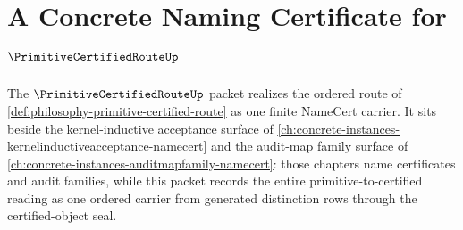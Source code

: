 \chapter{A Concrete Naming Certificate for $\PrimitiveCertifiedRouteUp$}
\label{ch:concrete-instances-primitive-certified-route-namecert}

The $\PrimitiveCertifiedRouteUp$ packet realizes the ordered route of \autoref{def:philosophy-primitive-certified-route} as one finite NameCert carrier. It sits beside the kernel-inductive acceptance surface of \autoref{ch:concrete-instances-kernelinductiveacceptance-namecert} and the audit-map family surface of \autoref{ch:concrete-instances-auditmapfamily-namecert}: those chapters name certificates and audit families, while this packet records the entire primitive-to-certified reading as one ordered carrier from generated distinction rows through the certified-object seal.



